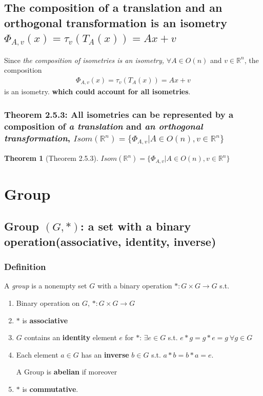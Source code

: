 \documentclass[11pt,a4paper]{article}
\newtheorem{theorem}{Theorem}
\begin{document}
\subsection{The composition of a translation and an orthogonal transformation is an isometry $\Phi_{A,v}(x)=\tau_v(T_A(x))=Ax+v$}
Since \textit{the composition of isometries is an isometry,} $\forall A\in O(n)$ and $v\in \mathbb{R}^n$, the composition
\begin{equation}
    \begin{aligned}
        \Phi_{A,v}(x)=\tau_v(T_A(x))=Ax+v
    \end{aligned}
    \nonumber
\end{equation}
is an isometry. \textbf{which could account for all isometries}.
\subsubsection{Theorem 2.5.3: All isometries can be represented by a composition of \textit{a translation} and \textit{an orthogonal transformation}, $Isom(\mathbb{R}^n)=\{\Phi_{A,v}|A\in O(n), v\in \mathbb{R}^n \}$}
\begin{theorem}[Theorem 2.5.3]
$Isom(\mathbb{R}^n)=\{\Phi_{A,v}|A\in O(n), v\in \mathbb{R}^n \}$
\end{theorem}



\section{Group}
\subsection{Group $(G, *)$: a set with a binary operation(associative, identity, inverse)}
\subsubsection{Definition}
A \textit{group} is a nonempty set $G$ with a binary operation $*:G \times G \rightarrow G$ s.t.
\begin{enumerate}[(1)]
    \item Binary operation on $G$, $*:G \times G \rightarrow G$
    \item $*$ is \textbf{associative}
    \item $G$ contains an \textbf{identity} element $e$ for $*$: $\exists e\in G$ s.t. $e * g = g * e = g\ \forall g \in G$
    \item Each element $a\in G$ has an \textbf{inverse} $b\in G$ s.t. $a*b=b*a=e$.

A Group is \textbf{abelian} if moreover
    \item $*$ is \textbf{commutative}.
\end{enumerate}
\end{document}
